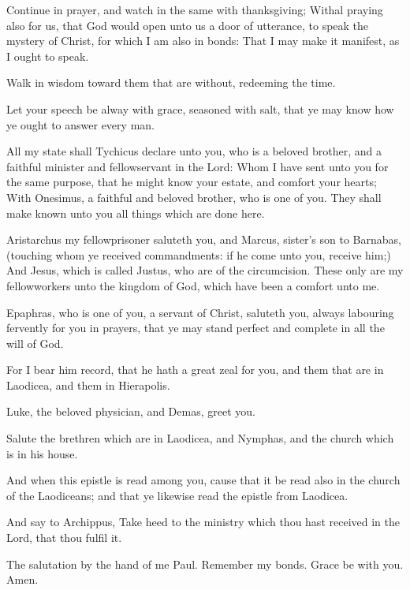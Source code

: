 \Verse Continue in prayer, and watch in the same with thanksgiving; \Verse Withal praying also for us, that God would open unto us a door of utterance, to speak the mystery of Christ, for which I am also in bonds: \Verse That I may make it manifest, as I ought to speak.

\Verse Walk in wisdom toward them that are without, redeeming the time.

\Verse Let your speech be alway with grace, seasoned with salt, that ye may know how ye ought to answer every man.

\Verse All my state shall Tychicus declare unto you, who is a beloved brother, and a faithful minister and fellowservant in the Lord: \Verse Whom I have sent unto you for the same purpose, that he might know your estate, and comfort your hearts; \Verse With Onesimus, a faithful and beloved brother, who is one of you. They shall make known unto you all things which are done here.

\Verse Aristarchus my fellowprisoner saluteth you, and Marcus, sister's son to Barnabas, (touching whom ye received commandments: if he come unto you, receive him;) \Verse And Jesus, which is called Justus, who are of the circumcision. These only are my fellowworkers unto the kingdom of God, which have been a comfort unto me.

\Verse Epaphras, who is one of you, a servant of Christ, saluteth you, always labouring fervently for you in prayers, that ye may stand perfect and complete in all the will of God.

\Verse For I bear him record, that he hath a great zeal for you, and them that are in Laodicea, and them in Hierapolis.

\Verse Luke, the beloved physician, and Demas, greet you.

\Verse Salute the brethren which are in Laodicea, and Nymphas, and the church which is in his house.

\Verse And when this epistle is read among you, cause that it be read also in the church of the Laodiceans; and that ye likewise read the epistle from Laodicea.

\Verse And say to Archippus, Take heed to the ministry which thou hast received in the Lord, that thou fulfil it.

\Verse The salutation by the hand of me Paul. Remember my bonds. Grace be with you. Amen.

